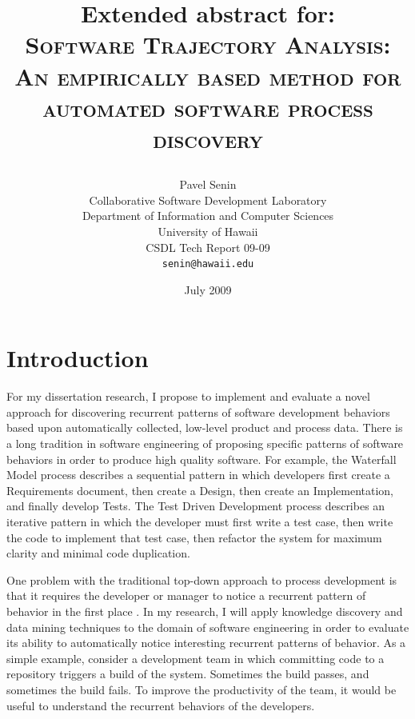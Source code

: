 \documentclass[11pt,oneside]{article}
\begin{document}
\title{Extended abstract for: \\
       \textsc{Software Trajectory Analysis:} \\
       \textsc{An empirically based method for automated software process discovery} \\
       \author{Pavel Senin \\
							 Collaborative Software Development Laboratory \\
               Department of Information and Computer Sciences \\
               University of Hawaii \\
               CSDL Tech Report 09-09 \\
               \texttt{senin@hawaii.edu}
       }
       \date{July 2009}
}
\maketitle


\section{Introduction}
For my dissertation research, I propose to implement and evaluate a novel approach for discovering recurrent patterns of software development behaviors based upon automatically collected, low-level product and process data. There is a long tradition in software engineering of proposing specific patterns of software behaviors in order to produce high quality software. For example, the Waterfall Model process describes a sequential pattern in which developers first create a Requirements document, then create a Design, then create an Implementation, and finally develop Tests. The Test Driven Development process describes an iterative pattern in which the developer must first write a test case, then write the code to implement that test case, then refactor the system for maximum clarity and minimal code duplication.

One problem with the traditional top-down approach to process development is that it requires the developer or manager to notice a recurrent pattern of behavior in the first place \cite{citeulike:5043104}. In my research, I will apply knowledge discovery and data mining techniques to the domain of software engineering in order to evaluate its ability to automatically notice interesting recurrent patterns of behavior. As a simple example, consider a development team in which committing code to a repository triggers a build of the system. Sometimes the build passes, and sometimes the build fails. To improve the productivity of the team, it would be useful to understand the recurrent behaviors of the developers. 
\end{document}
